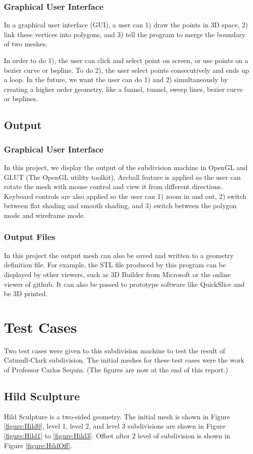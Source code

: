 \documentclass[12pt]{article}
\begin{document}
\subsubsection{Graphical User Interface}
In a graphical user interface (GUI), a user can 1) draw the points in 3D space, 2) link these vertices into polygons, and 3) tell the program to merge the boundary of two meshes. 

In order to do 1), the user can click and select point on screen, or use points on a bezier curve or bspline. To do 2), the user select points consecutively and ends up a loop. In the future, we want the user can do 1) and 2) simultaneously by creating a higher order geometry, like a funnel, tunnel, sweep lines, bezier curve or bsplines.

\subsection{Output}
\subsubsection{Graphical User Interface}
In this project, we display the output of the subdivision machine in OpenGL and GLUT (The OpenGL utility toolkit). 
Arcball feature is applied so the user can rotate the mesh with mouse control and view it from different directions. 
Keyboard controls are also applied so the user can 1) zoom in and out, 2) switch between flat shading and smooth shading, and 3) switch between the polygon mode and wireframe mode.
\subsubsection{Output Files}
In this project the output mesh can also be saved and written to a geometry definition file. For example, the STL file produced by this program can be displayed by other viewers, such as 3D Builder from Microsoft or the online viewer of github. It can also be passed to prototype software like QuickSlice and be 3D printed.

\newpage
\section{Test Cases}
Two test cases were given to this subdivision machine to test the result of Catmull-Clark subdivision. The initial meshes for these test cases were the work of Professor Carlos Sequin. (The figures are now at the end of this report.)
\subsection{Hild Sculpture}
Hild Sculpture is a two-sided geometry. The initial mesh is shown in Figure \ref{figure:Hild0}, level 1, level 2, and level 3 subdivisions are shown in Figure \ref{figure:Hild1} to \ref{figure:Hild3}. Offset after 2 level of subdivision is shown in Figure \ref{figure:HildOff}.
\end{document}
